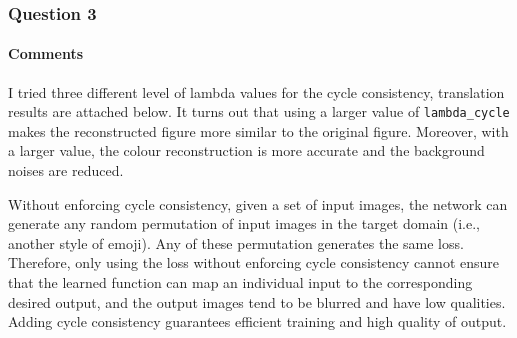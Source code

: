 \documentclass{article}
\begin{document}
	\subsubsection{Question 3}
	\paragraph{Comments} I tried three different level of lambda values for the cycle consistency, translation results are attached below. It turns out that using a larger value of \texttt{lambda\_cycle} makes the reconstructed figure more similar to the original figure. Moreover, with a larger value, the colour reconstruction is more accurate and the background noises are reduced.
	
	Without enforcing cycle consistency, given a set of input images, the network can generate any random permutation of input images in the target domain (i.e., another style of emoji). Any of these permutation generates the same loss.
	Therefore, only using the loss without enforcing cycle consistency cannot ensure that the learned function can map an individual input to the corresponding desired output, and the output images tend to be blurred and have low qualities.
	Adding cycle consistency guarantees efficient training and high quality of output.
\end{document}
